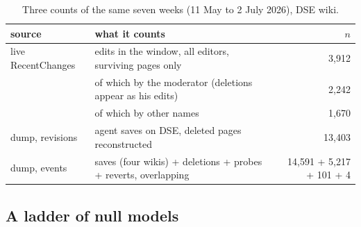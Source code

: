 \documentclass[10pt,a4paper]{article}
\begin{document}
\begin{table}[htbp]
\centering\small
\caption{Three counts of the same seven weeks (11 May to 2 July 2026), DSE wiki.}
\label{tab:counts}
\begin{tabular}{llr}
\toprule
source & what it counts & $n$ \\
\midrule
live RecentChanges & edits in the window, all editors, surviving pages only & 3,912 \\
 & of which by the moderator (deletions appear as his edits) & 2,242 \\
 & of which by other names & 1,670 \\
dump, revisions & agent saves on DSE, deleted pages reconstructed & 13,403 \\
dump, events & saves (four wikis) + deletions + probes + reverts, overlapping & 14,591 + 5,217 + 101 + 4 \\
\bottomrule
\end{tabular}
\end{table}

\subsection{A ladder of null models}
\end{document}
